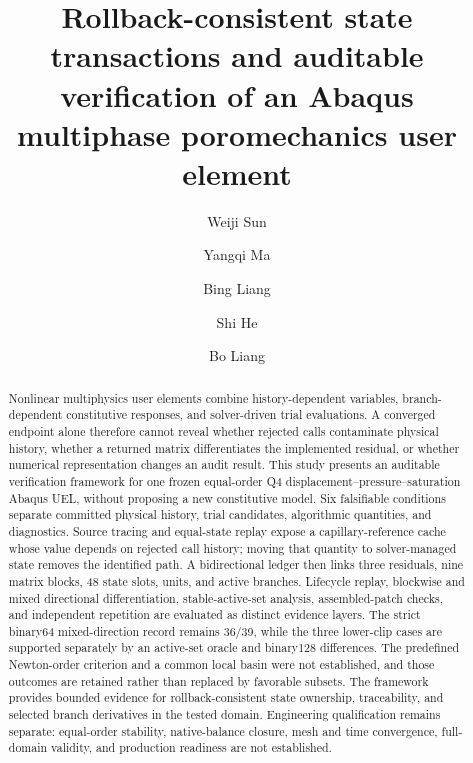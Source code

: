 \documentclass[preprint,12pt,authoryear]{elsarticle}
\begin{document}
\begin{frontmatter}

\title{Rollback-consistent state transactions and auditable verification of an Abaqus multiphase poromechanics user element}

\author[aff1]{Weiji Sun}
\author[aff1]{Yangqi Ma}
\author[aff1]{Bing Liang}
\author[aff2]{Shi He}
\author[aff1]{Bo Liang}

\begin{abstract}
Nonlinear multiphysics user elements combine history-dependent variables, branch-dependent constitutive responses, and solver-driven trial evaluations. A converged endpoint alone therefore cannot reveal whether rejected calls contaminate physical history, whether a returned matrix differentiates the implemented residual, or whether numerical representation changes an audit result. This study presents an auditable verification framework for one frozen equal-order Q4 displacement--pressure--saturation Abaqus UEL, without proposing a new constitutive model. Six falsifiable conditions separate committed physical history, trial candidates, algorithmic quantities, and diagnostics. Source tracing and equal-state replay expose a capillary-reference cache whose value depends on rejected call history; moving that quantity to solver-managed state removes the identified path. A bidirectional ledger then links three residuals, nine matrix blocks, 48 state slots, units, and active branches. Lifecycle replay, blockwise and mixed directional differentiation, stable-active-set analysis, assembled-patch checks, and independent repetition are evaluated as distinct evidence layers. The strict binary64 mixed-direction record remains 36/39, while the three lower-clip cases are supported separately by an active-set oracle and binary128 differences. The predefined Newton-order criterion and a common local basin were not established, and those outcomes are retained rather than replaced by favorable subsets. The framework provides bounded evidence for rollback-consistent state ownership, traceability, and selected branch derivatives in the tested domain. Engineering qualification remains separate: equal-order stability, native-balance closure, mesh and time convergence, full-domain validity, and production readiness are not established.
\end{abstract}


\end{frontmatter}
\end{document}
